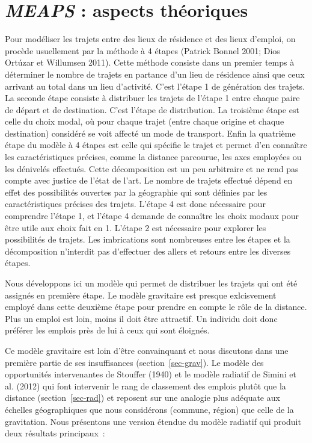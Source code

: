 \documentclass[
  10pt,
  a4paper,
  numbers=noendperiod,
  DIV=9]{scrreprt}
\begin{document}

\hypertarget{sec-theorie}{%
\chapter{\texorpdfstring{\emph{MEAPS} : aspects
théoriques}{MEAPS : aspects théoriques}}\label{sec-theorie}}

Pour modéliser les trajets entre des lieux de résidence et des lieux
d'emploi, on procède usuellement par la méthode à 4 étapes (Patrick
Bonnel 2001; Dios Ortúzar et Willumsen 2011). Cette méthode consiste
dans un premier temps à déterminer le nombre de trajets en partance d'un
lieu de résidence ainsi que ceux arrivant au total dans un lieu
d'activité. C'est l'étape 1 de génération des trajets. La seconde étape
consiste à distribuer les trajets de l'étape 1 entre chaque paire de
départ et de destination. C'est l'étape de distribution. La troisième
étape est celle du choix modal, où pour chaque trajet (entre chaque
origine et chaque destination) considéré se voit affecté un mode de
transport. Enfin la quatrième étape du modèle à 4 étapes est celle qui
spécifie le trajet et permet d'en connaître les caractéristiques
précises, comme la distance parcourue, les axes employées ou les
dénivelés effectués. Cette décomposition est un peu arbitraire et ne
rend pas compte avec justice de l'état de l'art. Le nombre de trajets
effectué dépend en effet des possibilités ouvertes par la géographie qui
sont définies par les caractéristiques précises des trajets. L'étape 4
est donc nécessaire pour comprendre l'étape 1, et l'étape 4 demande de
connaître les choix modaux pour être utile aux choix fait en 1. L'étape
2 est nécessaire pour explorer les possibilités de trajets. Les
imbrications sont nombreuses entre les étapes et la décomposition
n'interdit pas d'effectuer des allers et retours entre les diverses
étapes.

Nous développons ici un modèle qui permet de distribuer les trajets qui
ont été assignés en première étape. Le modèle gravitaire est presque
exlcisvement employé dans cette deuxième étape pour prendre en compte le
rôle de la distance. Plus un emploi est loin, moins il doit être
attractif. Un individu doit donc préférer les emplois près de lui à ceux
qui sont éloignés.

Ce modèle gravitaire est loin d'être convainquant et nous discutons dans
une première partie de ses insuffisances (section~\ref{sec-grav}). Le
modèle des opportunités intervenantes de Stouffer (1940) et le modèle
radiatif de Simini et al. (2012) qui font intervenir le rang de
classement des emplois plutôt que la distance (section~\ref{sec-rad}) et
reposent sur une analogie plus adéquate aux échelles géographiques que
nous considérons (commune, région) que celle de la gravitation. Nous
présentons une version étendue du modèle radiatif qui produit deux
résultats principaux~:
\end{document}
